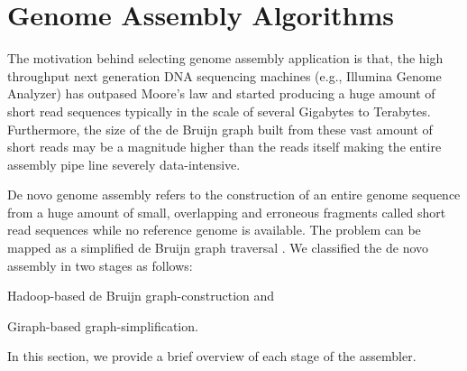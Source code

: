 \documentclass[journal]{IEEEtran}
\begin{document}
\section{Genome Assembly Algorithms}
\label{app:GenomeAssemblyAlgorithms}
The motivation behind selecting genome assembly application is that, the high throughput next generation DNA sequencing machines (e.g., Illumina Genome Analyzer) has outpased Moore's law and started producing a huge amount of short read sequences typically in the scale of several Gigabytes to Terabytes. Furthermore, the size of the de Bruijn graph built from these vast amount of short reads may be a magnitude higher than the reads itself making the entire assembly pipe line severely data-intensive.

De novo genome assembly refers to the construction of an entire genome sequence from a huge amount of small, overlapping and erroneous fragments called short read sequences while no reference genome is available. The problem can be mapped as a simplified de Bruijn graph traversal \cite{bio:debruijngraph}. We classified the de novo assembly in two stages as follows:
\begin{inparaenum}
\item Hadoop-based de Bruijn graph-construction and
\item Giraph-based graph-simplification.  
\end{inparaenum}
In this section, we provide a brief overview of each stage of the assembler. 
\end{document}
